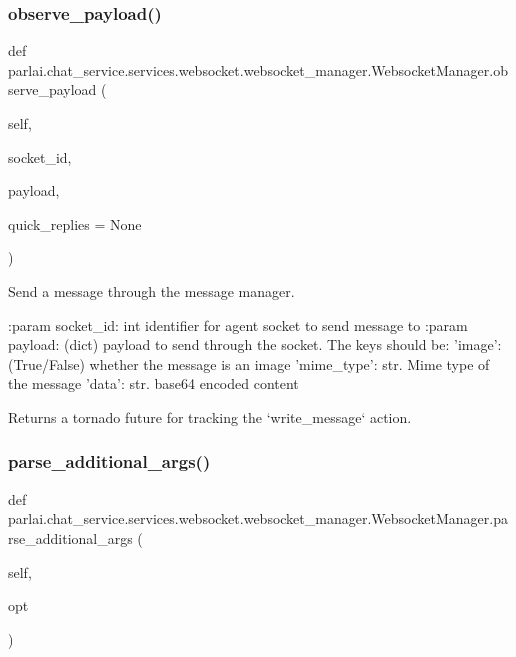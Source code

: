 \subsubsection{\texorpdfstring{observe\+\_\+payload()}{observe\_payload()}}
{\footnotesize\ttfamily def parlai.\+chat\+\_\+service.\+services.\+websocket.\+websocket\+\_\+manager.\+Websocket\+Manager.\+observe\+\_\+payload (\begin{DoxyParamCaption}\item[{}]{self,  }\item[{}]{socket\+\_\+id,  }\item[{}]{payload,  }\item[{}]{quick\+\_\+replies = {\ttfamily None} }\end{DoxyParamCaption})}

\begin{DoxyVerb}Send a message through the message manager.

:param socket_id:
    int identifier for agent socket to send message to
:param payload:
    (dict) payload to send through the socket. The keys should be:
'image': (True/False) whether the message is an image
'mime_type': str. Mime type of the message
'data': str. base64 encoded content

Returns a tornado future for tracking the `write_message` action.
\end{DoxyVerb}
 \mbox{\label{classparlai_1_1chat__service_1_1services_1_1websocket_1_1websocket__manager_1_1WebsocketManager_ab5ae0fc35ee7b4c2015954814b8b60de}} 
\subsubsection{\texorpdfstring{parse\+\_\+additional\+\_\+args()}{parse\_additional\_args()}}
{\footnotesize\ttfamily def parlai.\+chat\+\_\+service.\+services.\+websocket.\+websocket\+\_\+manager.\+Websocket\+Manager.\+parse\+\_\+additional\+\_\+args (\begin{DoxyParamCaption}\item[{}]{self,  }\item[{}]{opt }\end{DoxyParamCaption})}

